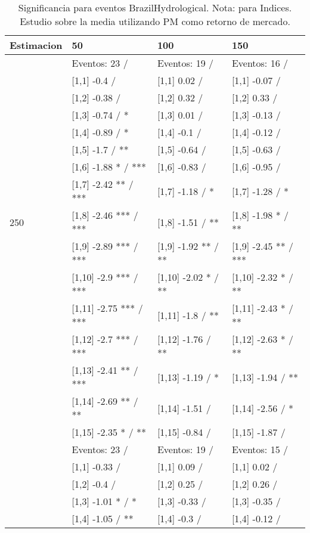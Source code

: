 \begin{table}

\caption{Significancia para eventos BrazilHydrological. Nota: para Indices. Estudio sobre la media utilizando PM como retorno de mercado.}
\centering
\begin{tabular}[t]{llll}
\toprule
Estimacion & 50 & 100 & 150\\
\midrule
 & Eventos:  23 / & Eventos:  19 / & Eventos:  16 /\\
 & {}[1,1] -0.4  / & {}[1,1] 0.02  / & {}[1,1] -0.07  /\\
 & {}[1,2] -0.38  / & {}[1,2] 0.32  / & {}[1,2] 0.33  /\\
 & {}[1,3] -0.74  / * & {}[1,3] 0.01  / & {}[1,3] -0.13  /\\
 & {}[1,4] -0.89  / * & {}[1,4] -0.1  / & {}[1,4] -0.12  /\\
\addlinespace
 & {}[1,5] -1.7  / ** & {}[1,5] -0.64  / & {}[1,5] -0.63  /\\
 & {}[1,6] -1.88 * / *** & {}[1,6] -0.83  / & {}[1,6] -0.95  /\\
 & {}[1,7] -2.42 ** / *** & {}[1,7] -1.18  / * & {}[1,7] -1.28  / *\\
250 & {}[1,8] -2.46 *** / *** & {}[1,8] -1.51  / ** & {}[1,8] -1.98 * / **\\
 & {}[1,9] -2.89 *** / *** & {}[1,9] -1.92 ** / ** & {}[1,9] -2.45 ** / ***\\
\addlinespace
 & {}[1,10] -2.9 *** / *** & {}[1,10] -2.02 * / ** & {}[1,10] -2.32 * / **\\
 & {}[1,11] -2.75 *** / *** & {}[1,11] -1.8  / ** & {}[1,11] -2.43 * / **\\
 & {}[1,12] -2.7 *** / *** & {}[1,12] -1.76  / ** & {}[1,12] -2.63 * / **\\
 & {}[1,13] -2.41 ** / *** & {}[1,13] -1.19  / * & {}[1,13] -1.94  / **\\
 & {}[1,14] -2.69 ** / ** & {}[1,14] -1.51  / & {}[1,14] -2.56  / *\\
\addlinespace
 & {}[1,15] -2.35 * / ** & {}[1,15] -0.84  / & {}[1,15] -1.87  /\\
 & Eventos:  23 / & Eventos:  19 / & Eventos:  15 /\\
 & {}[1,1] -0.33  / & {}[1,1] 0.09  / & {}[1,1] 0.02  /\\
 & {}[1,2] -0.4  / & {}[1,2] 0.25  / & {}[1,2] 0.26  /\\
 & {}[1,3] -1.01 * / * & {}[1,3] -0.33  / & {}[1,3] -0.35  /\\
\addlinespace
 & {}[1,4] -1.05  / ** & {}[1,4] -0.3  / & {}[1,4] -0.12  /\\

\end{tabular}
\end{table}
